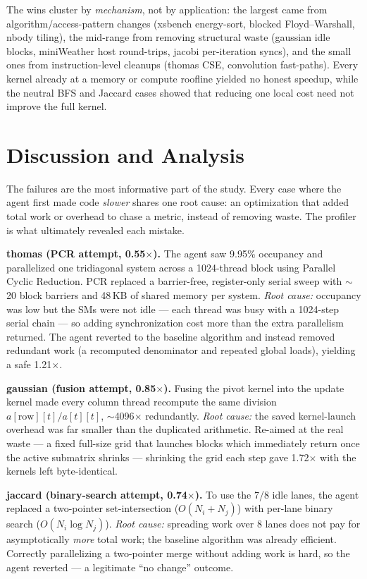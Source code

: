 \documentclass[conference]{IEEEtran}
\begin{document}
The wins cluster by \emph{mechanism}, not by application: the largest came from
algorithm/access-pattern changes (xsbench energy-sort, blocked Floyd--Warshall,
nbody tiling), the mid-range from removing structural waste (gaussian idle blocks,
miniWeather host round-trips, jacobi per-iteration syncs), and the small ones from
instruction-level cleanups (thomas CSE, convolution fast-paths). Every kernel
already at a memory or compute roofline yielded no honest speedup, while the
neutral BFS and Jaccard cases showed that reducing one local cost need not
improve the full kernel.

\section{Discussion and Analysis}
The failures are the most informative part of the study. Every case where the
agent first made code \emph{slower} shares one root cause: an optimization that
added total work or overhead to chase a metric, instead of removing waste. The
profiler is what ultimately revealed each mistake.

\textbf{thomas (PCR attempt, 0.55$\times$).} The agent saw 9.95\% occupancy and
parallelized one tridiagonal system across a 1024-thread block using Parallel
Cyclic Reduction. PCR replaced a barrier-free, register-only serial sweep with
$\sim$20 block barriers and 48\,KB of shared memory per system. \emph{Root cause:}
occupancy was low but the SMs were not idle --- each thread was busy with a 1024-step
serial chain --- so adding synchronization cost more than the extra parallelism
returned. The agent reverted to the baseline algorithm and instead removed
redundant work (a recomputed denominator and repeated global loads), yielding a
safe 1.21$\times$.

\textbf{gaussian (fusion attempt, 0.85$\times$).} Fusing the pivot kernel into the
update kernel made every column thread recompute the same division
$a[\text{row}][t]/a[t][t]$, $\sim$4096$\times$ redundantly. \emph{Root cause:} the
saved kernel-launch overhead was far smaller than the duplicated arithmetic.
Re-aimed at the real waste --- a fixed full-size grid that launches blocks which
immediately return once the active submatrix shrinks --- shrinking the grid each
step gave 1.72$\times$ with the kernels left byte-identical.

\textbf{jaccard (binary-search attempt, 0.74$\times$).} To use the 7/8 idle lanes,
the agent replaced a two-pointer set-intersection ($O(N_i{+}N_j)$) with per-lane
binary search ($O(N_i\log N_j)$). \emph{Root cause:} spreading work over 8 lanes
does not pay for asymptotically \emph{more} total work; the baseline algorithm was
already efficient. Correctly parallelizing a two-pointer merge without adding work
is hard, so the agent reverted --- a legitimate ``no change'' outcome.
\end{document}
